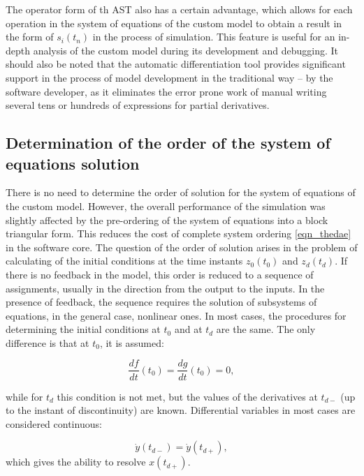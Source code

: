 \documentclass[lettersize,journal]{IEEEtran}
\begin{document}
The operator form of th AST also has a certain advantage, which allows for each operation in the system of equations of the custom model to 
obtain a result in the form of \(s_i (t_n)\) in the process of simulation. This feature is useful for an in-depth analysis of the custom model 
during its development and debugging. It should also be noted that the automatic differentiation tool provides significant support 
in the process of model development in the traditional way -- by the software developer, as it eliminates the error prone work of manual writing 
several tens or hundreds of expressions for partial derivatives.

\subsection{Determination of the order of the system of equations solution} 

There is no need to determine the order of solution for the system of equations of the custom model.
However, the overall performance of the simulation was slightly affected by the pre-ordering of the system of
equations into a block triangular form. This reduces the cost of complete system ordering 
\eqref{eqn_thedae} in the software core. The question of the order of solution arises in the problem of
calculating of the initial conditions at the time instants \(z_0 (t_0)\) and \(z_d (t_d)\). 
If there is no feedback in the model, this order is reduced to a sequence of assignments, usually in the
direction from the output to the inputs. In the presence of feedback, the sequence requires the solution of
subsystems of equations, in the general case, nonlinear ones. In most cases, the procedures for determining the
initial conditions at \(t_0\) and at \(t_d\) are the same. The only difference is that at \(t_0\), it is assumed:

\begin{equation}
	\label{eqn_opthree}
	\frac{df}{dt}(t_0)=\frac{dg}{dt}(t_0)=0,
\end{equation}

\noindent while for \(t_d \) this condition is not met, but the values of the derivatives at 
\(t_{d-}\) (up to the instant of discontinuity) are known. Differential variables in most cases are considered continuous:

\begin{equation}
	\label{eqn_cont}
	\dot{y}(t_{d-})=\dot{y}(t_{d+}),
\end{equation}
\noindent which gives the ability to resolve \(x(t_{d+})\).
\end{document}
